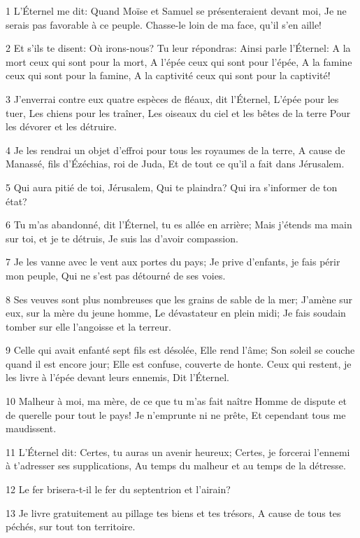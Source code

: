 \par 1 L'Éternel me dit: Quand Moïse et Samuel se présenteraient devant moi, Je ne serais pas favorable à ce peuple. Chasse-le loin de ma face, qu'il s'en aille!
\par 2 Et s'ils te disent: Où irons-nous? Tu leur répondras: Ainsi parle l'Éternel: A la mort ceux qui sont pour la mort, A l'épée ceux qui sont pour l'épée, A la famine ceux qui sont pour la famine, A la captivité ceux qui sont pour la captivité!
\par 3 J'enverrai contre eux quatre espèces de fléaux, dit l'Éternel, L'épée pour les tuer, Les chiens pour les traîner, Les oiseaux du ciel et les bêtes de la terre Pour les dévorer et les détruire.
\par 4 Je les rendrai un objet d'effroi pour tous les royaumes de la terre, A cause de Manassé, fils d'Ézéchias, roi de Juda, Et de tout ce qu'il a fait dans Jérusalem.
\par 5 Qui aura pitié de toi, Jérusalem, Qui te plaindra? Qui ira s'informer de ton état?
\par 6 Tu m'as abandonné, dit l'Éternel, tu es allée en arrière; Mais j'étends ma main sur toi, et je te détruis, Je suis las d'avoir compassion.
\par 7 Je les vanne avec le vent aux portes du pays; Je prive d'enfants, je fais périr mon peuple, Qui ne s'est pas détourné de ses voies.
\par 8 Ses veuves sont plus nombreuses que les grains de sable de la mer; J'amène sur eux, sur la mère du jeune homme, Le dévastateur en plein midi; Je fais soudain tomber sur elle l'angoisse et la terreur.
\par 9 Celle qui avait enfanté sept fils est désolée, Elle rend l'âme; Son soleil se couche quand il est encore jour; Elle est confuse, couverte de honte. Ceux qui restent, je les livre à l'épée devant leurs ennemis, Dit l'Éternel.
\par 10 Malheur à moi, ma mère, de ce que tu m'as fait naître Homme de dispute et de querelle pour tout le pays! Je n'emprunte ni ne prête, Et cependant tous me maudissent.
\par 11 L'Éternel dit: Certes, tu auras un avenir heureux; Certes, je forcerai l'ennemi à t'adresser ses supplications, Au temps du malheur et au temps de la détresse.
\par 12 Le fer brisera-t-il le fer du septentrion et l'airain?
\par 13 Je livre gratuitement au pillage tes biens et tes trésors, A cause de tous tes péchés, sur tout ton territoire.

